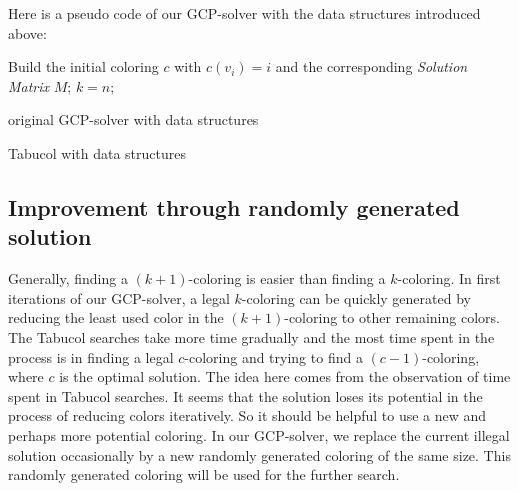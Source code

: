 \documentclass[12pt,a4paper,twoside]{scrartcl}
\numberwithin{equation}{section}
\begin{document}
Here is a pseudo code of our GCP-solver with the data structures introduced above:


\begin{algorithm}[h!]\label{Original solver}
 Build the initial coloring $c$ with $c(v_i) = i$ and the corresponding \emph{Solution Matrix} $M$;\;
 $k = n$;\;
 \caption{original GCP-solver with data structures}
 \end{algorithm}
\begin{algorithm}[h!]\label{Tabucol with data structures}
 \caption{Tabucol with data structures}
 \end{algorithm}
\subsection{Improvement through randomly generated solution}
\label{subsec:Improvement through randomly generated solution}
Generally, finding a $(k+1)$-coloring is easier than finding a $k$-coloring. In first iterations of our GCP-solver, a legal $k$-coloring can be quickly generated by reducing the least used color in the $(k+1)$-coloring to other remaining colors. The Tabucol searches take more time gradually and the most time spent in the process is in finding a legal $c$-coloring and trying to find a $(c-1)$-coloring, where $c$ is the optimal solution. The idea here comes from the observation of time spent in Tabucol searches. It seems that the solution loses its potential in the process of reducing colors iteratively. So it should be helpful to use a new and perhaps more potential coloring. In our GCP-solver, we replace the current illegal solution  occasionally by a new randomly generated coloring of the same size. This randomly generated coloring will be used for the further search.
\end{document}
